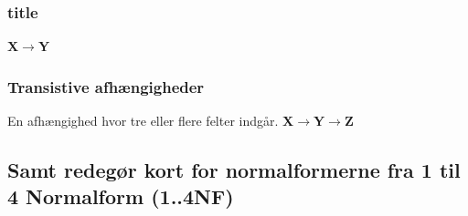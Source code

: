 \subsubsection{title}

\textbf{X$\rightarrow$Y}
\subsubsection{Transistive afhængigheder}
En afhængighed hvor tre eller flere felter indgår.
\textbf{X$\rightarrow$Y$\rightarrow$Z}


\subsection{Samt redegør kort for normalformerne fra 1 til 4 Normalform (1..4NF)}

